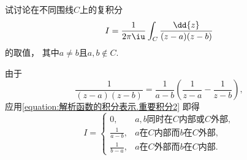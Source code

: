 \begin{example}
试讨论在不同围线\(C\)上的复积分\begin{equation*}
	I = \frac{1}{2\pi\iu} \int_C \frac{\dd{z}}{(z-a)(z-b)}
\end{equation*}的取值，
其中\(a \neq b\)且\(a,b \notin C\).
\begin{solution}
由于\begin{equation*}
	\frac{1}{(z-a)(z-b)}
	= \frac{1}{a-b} \left(\frac{1}{z-a}-\frac{1}{z-b}\right),
\end{equation*}
应用\cref{equation:解析函数的积分表示.重要积分2}
即得\begin{equation*}
	I = \left\{\begin{array}{cl}
		0, & \text{\(a,b\)同时在\(C\)内部或\(C\)外部}, \\
		\frac{1}{a-b}, & \text{\(a\)在\(C\)内部而\(b\)在\(C\)外部}, \\
		\frac{1}{b-a}, & \text{\(a\)在\(C\)外部而\(b\)在\(C\)内部}.
	\end{array}\right.
\end{equation*}
\end{solution}
\end{example}

